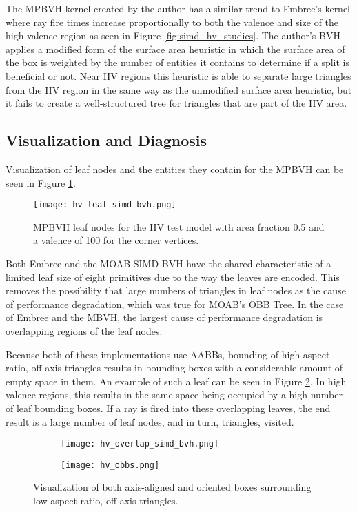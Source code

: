 The MPBVH kernel created by the author has a similar trend to Embree's kernel
where ray fire times increase proportionally to both the valence and size of the
high valence region as seen in Figure \ref{fig:simd_hv_studies}. The author's
BVH applies a modified form of the surface area heuristic in which the surface
area of the box is weighted by the number of entities it contains to determine
if a split is beneficial or not. Near HV regions this heuristic is able to
separate large triangles from the HV region in the same way as the unmodified
surface area heuristic, but it fails to create a well-structured tree for
triangles that are part of the HV area.

\subsection{Visualization and Diagnosis}

Visualization of leaf nodes and the entities they contain for the MPBVH
can be seen in Figure \ref{fig:hv_leaf_simd_bvh}.

\begin{figure}
  \centering
  \texttt{[image: hv\_leaf\_simd\_bvh.png]}
  \caption{MPBVH leaf nodes for the HV test model with area fraction
    0.5 and a valence of 100 for the corner vertices.}
  \label{fig:hv_leaf_simd_bvh}
\end{figure}
  
Both Embree and the MOAB SIMD BVH have the shared characteristic of a limited
leaf size of eight primitives due to the way the leaves are encoded. This
removes the possibility that large numbers of triangles in leaf nodes as the
cause of performance degradation, which was true for MOAB's OBB Tree. In the case
of Embree and the MBVH, the largest cause of performance degradation is
overlapping regions of the leaf nodes.

Because both of these implementations use AABBs, bounding of high aspect ratio,
off-axis triangles results in bounding boxes with a considerable amount of empty
space in them. An example of such a leaf can be seen in Figure
\ref{fig:hv_overlap_simd_bvh}. In high valence regions, this results in the same
space being occupied by a high number of leaf bounding boxes. If a ray is fired
into these overlapping leaves, the end result is a large number of leaf nodes,
and in turn, triangles, visited.

\begin{figure}
  \centering
  \begin{subfigure}{.5\textwidth}
    \centering
    \texttt{[image: hv\_overlap\_simd\_bvh.png]}
  \end{subfigure}%
  \begin{subfigure}{.5\textwidth}
    \centering
    \texttt{[image: hv\_obbs.png]}
  \end{subfigure}
  \caption{Visualization of both axis-aligned and oriented boxes surrounding low
    aspect ratio, off-axis triangles.}
  \label{fig:hv_overlap_simd_bvh}
\end{figure}

